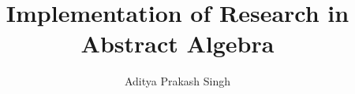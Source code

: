 \documentclass[a4paper,11pt]{article}
\begin{document}
\title{Implementation of Research in Abstract Algebra}
\author{Aditya Prakash Singh}
\def\rollno{160052}
\def\handindate{4th June 2017}

\maketitle



\end{document}

